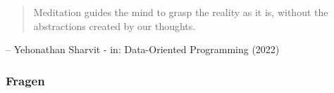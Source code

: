 \documentclass{beamer}
\begin{document}
\begin{frame}
\begin{quote}
Meditation guides the mind to grasp the reality as it is, without the abstractions created by our thoughts.
\end{quote}

\vspace{3cm}

-- Yehonathan Sharvit - in: Data-Oriented Programming (2022)
\end{frame}

\begin{frame}
\frametitle{Fragen}
\end{frame}
\end{document}
